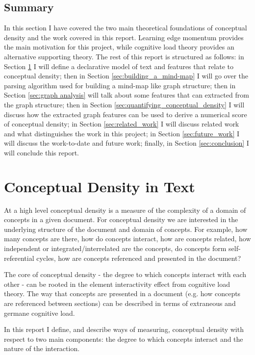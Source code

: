 \documentclass[12pt]{article}
\begin{document}
\subsection{Summary}
In this section I have covered the two main theoretical foundations of conceptual density and the work covered in this report. Learning edge momentum provides the main motivation for this project, while cognitive load theory provides an alternative supporting theory. The rest of this report is structured as follows: in Section \ref{sec:conceptual_density_in_text} I will define a declarative model of text and features that relate to conceptual density; then in Section \ref{sec:building_a_mind-map} I will go over the parsing algorithm used for building a mind-map like graph structure; then in Section \ref{sec:graph analysis} will talk about some features that can extracted from the graph structure; then in Section \ref{sec:quantifying_conceptual_density} I will discuss how the extracted graph features can be used to derive a numerical score of conceptual density; in Section \ref{sec:related_work} I will discuss related work and what distinguishes the work in this project; in Section \ref{sec:future_work} I will discuss the work-to-date and future work; finally, in Section \ref{sec:conclusion} I will conclude this report.

\section{Conceptual Density in Text} \label{sec:conceptual_density_in_text}
At a high level conceptual density is a measure of the complexity of a domain of concepts in a given document. For conceptual density we are interested in the underlying structure of the document and domain of concepts. For example, how many concepts are there, how do concepts interact, how are concepts related, how independent or integrated/interrelated are the concepts, do concepts form self-referential cycles, how are concepts referenced and presented in the document?

The core of conceptual density - the degree to which concepts interact with each other - can be rooted in the element interactivity effect from cognitive load theory. The way that concepts are presented in a document (e.g. how concepts are referenced between sections) can be described in terms of extraneous and germane cognitive load. 

In this report I define, and describe ways of measuring, conceptual density with respect to two main components: the degree to which concepts interact and the nature of the interaction.  
\end{document}
